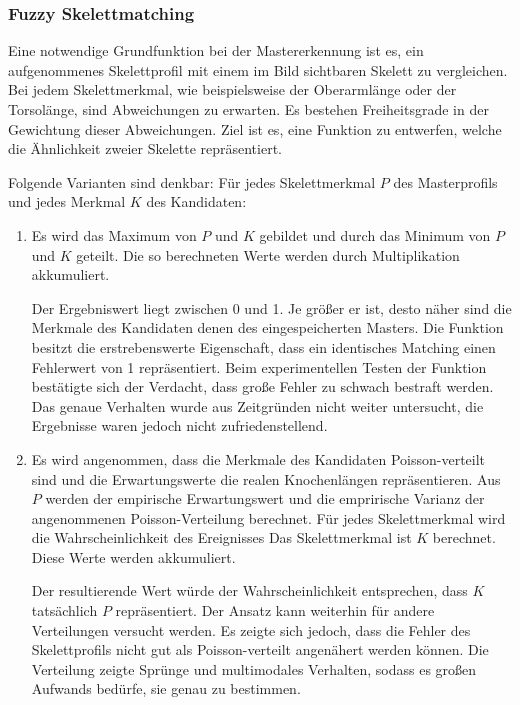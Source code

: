\subsubsection{Fuzzy Skelettmatching}
Eine notwendige Grundfunktion bei der Mastererkennung ist es, ein aufgenommenes Skelettprofil mit einem im Bild sichtbaren Skelett zu vergleichen.
Bei jedem Skelettmerkmal, wie beispielsweise der Oberarmlänge oder der Torsolänge, sind Abweichungen zu erwarten.
Es bestehen Freiheitsgrade in der Gewichtung dieser Abweichungen.
Ziel ist es, eine Funktion zu entwerfen, welche die Ähnlichkeit zweier Skelette repräsentiert.
\par
Folgende Varianten sind denkbar: 
Für jedes Skelettmerkmal $P$ des Masterprofils und jedes Merkmal $K$ des Kandidaten: 


\begin{enumerate}
\item Es wird das Maximum von $P$ und $K$ gebildet und durch das Minimum von $P$ und $K$ geteilt. Die so berechneten Werte werden durch Multiplikation akkumuliert.
\par
Der Ergebniswert liegt zwischen 0 und 1.
Je größer er ist, desto näher sind die Merkmale des Kandidaten denen des eingespeicherten Masters. 
Die Funktion besitzt die erstrebenswerte Eigenschaft, dass ein identisches Matching einen Fehlerwert von 1 repräsentiert.
Beim experimentellen Testen der Funktion bestätigte sich der Verdacht, dass große Fehler zu schwach bestraft werden.
Das genaue Verhalten wurde aus Zeitgründen nicht weiter untersucht, die Ergebnisse waren jedoch nicht zufriedenstellend.
\item Es wird angenommen, dass die Merkmale des Kandidaten Poisson-verteilt sind und die Erwartungswerte die realen Knochenlängen repräsentieren.
Aus $P$ werden der empirische Erwartungswert und die emprirische Varianz der angenommenen Poisson-Verteilung berechnet.
Für jedes Skelettmerkmal wird die Wahrscheinlichkeit des Ereignisses \glqq{}Das Skelettmerkmal ist $K$\grqq{} berechnet. Diese Werte werden akkumuliert.
\par
Der resultierende Wert würde der Wahrscheinlichkeit entsprechen, dass $K$ tatsächlich $P$ repräsentiert.
Der Ansatz kann weiterhin für andere Verteilungen versucht werden.
Es zeigte sich jedoch, dass die Fehler des Skelettprofils nicht gut als Poisson-verteilt angenähert werden können.
Die Verteilung zeigte Sprünge und multimodales Verhalten, sodass es großen Aufwands bedürfe, sie genau zu bestimmen.


\end{enumerate}
